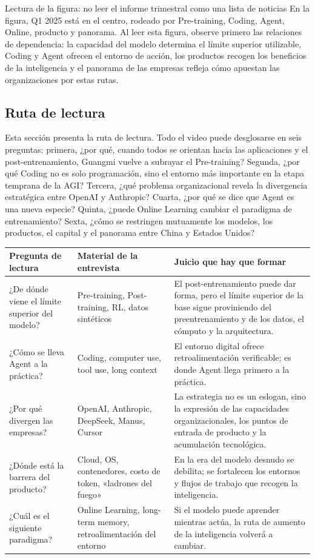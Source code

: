 \begin{knowledgebox}{Lectura de la figura: no leer el informe trimestral como una lista de noticias}
En la figura, Q1 2025 está en el centro, rodeado por Pre-training, Coding, Agent, Online, producto y panorama. Al leer esta figura, observe primero las relaciones de dependencia: la capacidad del modelo determina el límite superior utilizable, Coding y Agent ofrecen el entorno de acción, los productos recogen los beneficios de la inteligencia y el panorama de las empresas refleja cómo apuestan las organizaciones por estas rutas.
\end{knowledgebox}

\subsection{Ruta de lectura}

Esta sección presenta la ruta de lectura. Todo el video puede desglosarse en seis preguntas: primera, ¿por qué, cuando todos se orientan hacia las aplicaciones y el post-entrenamiento, Guangmi vuelve a subrayar el Pre-training? Segunda, ¿por qué Coding no es solo programación, sino el entorno más importante en la etapa temprana de la AGI? Tercera, ¿qué problema organizacional revela la divergencia estratégica entre OpenAI y Anthropic? Cuarta, ¿por qué se dice que Agent es una nueva especie? Quinta, ¿puede Online Learning cambiar el paradigma de entrenamiento? Sexta, ¿cómo se restringen mutuamente los modelos, los productos, el capital y el panorama entre China y Estados Unidos?

\noindent\begin{tabularx}{\textwidth}{p{}p{}X}
\toprule
Pregunta de lectura & Material de la entrevista & Juicio que hay que formar \\
\midrule
¿De dónde viene el límite superior del modelo? & Pre-training, Post-training, RL, datos sintéticos & El post-entrenamiento puede dar forma, pero el límite superior de la base sigue proviniendo del preentrenamiento y de los datos, el cómputo y la arquitectura. \\
¿Cómo se lleva Agent a la práctica? & Coding, computer use, tool use, long context & El entorno digital ofrece retroalimentación verificable; es donde Agent llega primero a la práctica. \\
¿Por qué divergen las empresas? & OpenAI, Anthropic, DeepSeek, Manus, Cursor & La estrategia no es un eslogan, sino la expresión de las capacidades organizacionales, los puntos de entrada de producto y la acumulación tecnológica. \\
¿Dónde está la barrera del producto? & Cloud, OS, contenedores, costo de token, «ladrones del fuego» & En la era del modelo desnudo se debilita; se fortalecen los entornos y flujos de trabajo que recogen la inteligencia. \\
¿Cuál es el siguiente paradigma? & Online Learning, long-term memory, retroalimentación del entorno & Si el modelo puede aprender mientras actúa, la ruta de aumento de la inteligencia volverá a cambiar. \\
\bottomrule
\end{tabularx}

